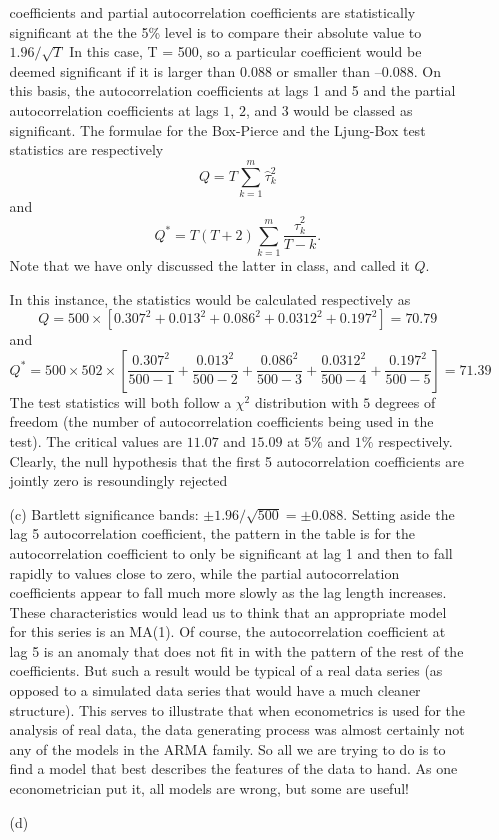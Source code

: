 \documentclass[11pt,a4paper]{article}
\begin{document}
\begin{itemize}
\begin{itemize}
coefficients and partial autocorrelation coefficients are statistically
significant at the the 5\% level is to compare their absolute value to $1.96/\sqrt{T}$
In this case, T = 500,
so a particular coefficient would be deemed significant if it is larger than
$0.088$ or smaller than $–0.088$. On this basis, the autocorrelation
coefficients at lags 1 and 5 and the partial autocorrelation coefficients at
lags $1$, $2$, and $3$ would be classed as significant. The formulae for the
Box-Pierce and the Ljung-Box test statistics are respectively
$$
Q = T \sum_{k=1}^m \hat \tau_k^2
$$
and
$$
Q^* = T(T+2) \sum_{k=1}^m \frac{\hat \tau_k^2}{T-k}.
$$
Note that we have only discussed the latter in class, and called it $Q$.

In this instance, the statistics would be calculated respectively as
$$
Q = 500 × \left[0.307^2 + 0.013^2 + 0.086^2 + 0.0312^2 + 0.197^2\right] = 70.79
$$
and
$$
Q^* = 500\times 502 \times \left[\frac{0.307^2}{500-1} + \frac{0.013^2}{500-2} + \frac{0.086^2}{500-3} + \frac{0.0312^2}{500-4} + \frac{0.197^2}{500-5}\right] = 71.39
$$
The test statistics will both follow a $\chi^2$ distribution with $5$ degrees
of freedom (the number of autocorrelation coefficients being used in the test).
 The critical values are $11.07$ and $15.09$ at $5\%$ and $1\%$ respectively.
Clearly,
the null hypothesis that the first 5 autocorrelation coefficients are jointly
zero is resoundingly rejected
\item[(c)] Bartlett significance bands: $\pm 1.96/\sqrt{500} = \pm 0.088$. Setting aside the lag 5 autocorrelation coefficient, the pattern in
the table is for the autocorrelation coefficient to only be significant at lag
1 and then to fall rapidly to values close to zero, while the partial
autocorrelation coefficients appear to fall much more slowly as the lag length
increases. These characteristics would lead us to think that an appropriate
model for this series is an MA(1). Of course, the autocorrelation coefficient
at lag 5 is an anomaly that does not fit in with the pattern of the rest of
the coefficients. But such a result would be typical of a real data series (as
opposed to a simulated data series that would have a much cleaner structure).
This serves to illustrate that when econometrics is used for the analysis of
real data, the data generating process was almost certainly not any of the
models in the ARMA family. So all we are trying to do is to find a model that
best describes the features of the data to hand. As one econometrician put it,
all models are wrong, but some are useful!
\item[(d)]

\end{itemize}
\end{itemize}
\end{document}

